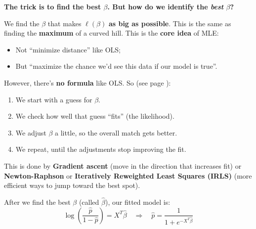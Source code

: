 \highspace
\begin{flushleft}
    \textcolor{Green3}{ \textbf{The trick is to find the best $\beta$. But how do we identify the \emph{best} $\beta$?}}
\end{flushleft}
We find the $\beta$ that makes $\ell\left(\beta\right)$ \textbf{as big as possible}. This is the same as finding the \textbf{maximum} of a curved hill. This is the \textbf{core idea} of MLE:
\begin{itemize}
    \item Not ``minimize distance'' like OLS;
    \item But ``maximize the chance we'd see this data if our model is true''.
\end{itemize}
However, there's \textbf{no formula} like OLS. So (see page \pageref{subsubsection: Fitting GLMs}):
\begin{enumerate}
    \item We start with a guess for $\beta$.
    \item We check how well that guess ``fits'' (the likelihood).
    \item We adjust $\beta$ a little, so the overall match gets better.
    \item We repeat, until the adjustments stop improving the fit.
\end{enumerate}
This is done by \textbf{Gradient ascent} (move in the direction that increases fit) or \textbf{Newton-Raphson} or \textbf{Iteratively Reweighted Least Squares (IRLS)} (more efficient ways to jump toward the best spot).

\highspace
After we find the best $\beta$ (called $\hat{\beta}$), our fitted model is:
\begin{equation}
    \log \left(\dfrac{\hat{p}}{1 - \hat{p}}\right) = X^T \hat{\beta}
    \quad \Longrightarrow \quad 
    \hat{p} = \frac{1}{1 + e^{-X^T \hat{\beta}}}
\end{equation}
